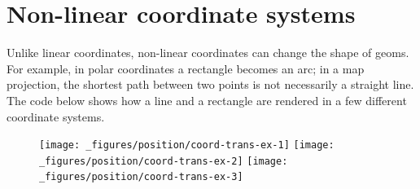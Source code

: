 \hypertarget{sub:coord-non-linear}{%
\section{Non-linear coordinate systems}\label{sub:coord-non-linear}}

Unlike linear coordinates, non-linear coordinates can change the shape
of geoms. For example, in polar coordinates a rectangle becomes an arc;
in a map projection, the shortest path between two points is not
necessarily a straight line. The code below shows how a line and a
rectangle are rendered in a few different coordinate systems.

\begin{Shaded}
\begin{Highlighting}[]
\StringTok{ }\NormalTok{(} \NormalTok{, } \NormalTok{)}
\StringTok{ }\NormalTok{(} \NormalTok{(}\NormalTok{, }\NormalTok{), } \NormalTok{(}\NormalTok{, }\NormalTok{))}
\StringTok{ }\NormalTok{(} \OperatorTok{+}\StringTok{ }
\StringTok{  }\NormalTok{(}\NormalTok{(} \NormalTok{, } \NormalTok{)) }\OperatorTok{+}\StringTok{ }
\StringTok{  }\NormalTok{(}\OperatorTok{+}\StringTok{ }
\StringTok{  }\NormalTok{(}\NormalTok{) }\OperatorTok{+}\StringTok{ }\NormalTok{(}\NormalTok{)}
\OperatorTok{+}\StringTok{ }\NormalTok{(}\NormalTok{)}
\OperatorTok{+}\StringTok{ }\NormalTok{(}\NormalTok{)}
\end{Highlighting}
\end{Shaded}

\begin{figure}[H]
  \texttt{[image: \_figures/position/coord-trans-ex-1]}%
  \texttt{[image: \_figures/position/coord-trans-ex-2]}%
  \texttt{[image: \_figures/position/coord-trans-ex-3]}
\end{figure}

